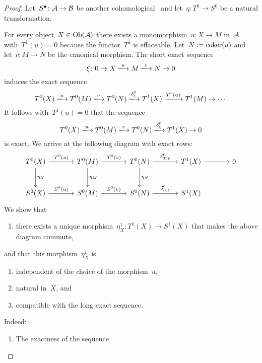 \begin{proof}
  Let~$S^\bullet \colon \mathcal{A} \to \mathcal{B}$ be another cohomological~{\deltafun} and let~$\eta \colon T^0 \to S^0$ be a natural transformation.
  
  For every object~$X \in \operatorname{Ob}(\mathcal{A})$ there exists a monomorphism~$u \colon X \to M$ in~$\mathcal{A}$ with~$T^1(u) = 0$ because the functor~$T^1$ is effaceable.
  Let~$N \coloneqq \operatorname{coker}(u)$ and let~$v \colon M \to N$ be the canonical morphism.
  The short exact sequence
  \[
    \xi
    \colon
    0
    \to
    X
    \xlongto{u}
    M
    \xlongto{v}
    N
    \to
    0
  \]
  induces the exact sequence
  \[
    T^0(X)
    \xlongto{u}
    T^0(M)
    \xlongto{v}
    T^0(N)
    \xlongto{\delta^0_\xi}
    T^1(X)
    \xlongto{T^1(u)}
    T^1(M)
    \to
    \dotsb
  \]
  It follows with~$T^1(u) = 0$ that the sequence
  \[
    T^0(X)
    \xlongto{u}
    T^0(M)
    \xlongto{v}
    T^0(N)
    \xlongto{\delta^0_\xi}
    T^1(X)
    \to
    0
  \]
  is exact.
  We arrive at the following diagram with exact rows:
  \[
    \begin{tikzcd}[sep = large]
        T^0(X)
        \arrow{r}[above]{T^0(u)}
        \arrow{d}[right]{\eta_X}
      & T^0(M)
        \arrow{r}[above]{T^0(v)}
        \arrow{d}[right]{\eta_M}
      & T^0(N)
        \arrow{r}[above]{\delta^0_{T,\xi}}
        \arrow{d}[right]{\eta_N}
      & T^1(X)
        \arrow{r}
      & 0
      \\
        S^0(X)
        \arrow{r}[above ]{S^0(u)}
      & S^0(M)
        \arrow{r}[above]{S^0(v)}
      & S^0(N)
        \arrow{r}[above]{\delta^0_{S,\xi}}
      & S^1(X)
      & {}
    \end{tikzcd}
  \]
  We show that
  \begin{enumerate}
    \item
      there exists a unique morphism~$\eta^1_X \colon T^1(X) \to S^1(X)$ that makes the above diagram commute,
  \end{enumerate}
  and that this morphism~$\eta^1_X$ is
  \begin{enumerate}[resume]
    \item
      independent of the choice of the morphism~$u$,
    \item
      natural in~$X$, and
    \item
      compatible with the long exact sequence.
  \end{enumerate}
  Indeed:
  \begin{enumerate}
    \item
      The exactness of the sequence

\end{enumerate}
\end{proof}
